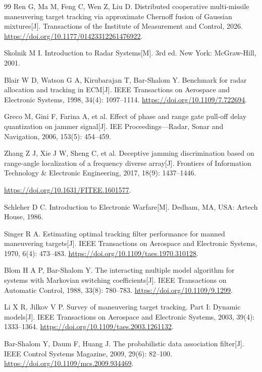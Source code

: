 \documentclass[UTF8,a4paper,zihao=-4]{ctexart}
\begin{document}
{\begin{thebibliography}{99}
 Ren G, Ma M, Feng C, Wen Z, Liu D. Distributed cooperative multi-missile maneuvering target tracking via approximate Chernoff fusion of Gaussian mixtures[J]. Transactions of the Institute of Measurement and Control, 2026.
\url{https://doi.org/10.1177/01423312261476922}.

 Skolnik M I. Introduction to Radar Systems[M]. 3rd ed. New York: McGraw-Hill, 2001.

 Blair W D, Watson G A, Kirubarajan T, Bar-Shalom Y. Benchmark for radar allocation and tracking in ECM[J]. IEEE Transactions on Aerospace and Electronic Systems, 1998, 34(4): 1097--1114. \url{https://doi.org/10.1109/7.722694}.

 Greco M, Gini F, Farina A, et al. Effect of phase and range gate pull-off delay quantization on jammer signal[J]. IEE Proceedings---Radar, Sonar and Navigation, 2006, 153(5): 454--459.

 Zhang Z J, Xie J W, Sheng C, et al. Deceptive jamming discrimination based on range-angle localization of a frequency diverse array[J]. Frontiers of Information Technology \& Electronic Engineering, 2017, 18(9): 1437--1446.

\url{https://doi.org/10.1631/FITEE.1601577}.

 Schleher D C. Introduction to Electronic Warfare[M]. Dedham, MA, USA: Artech House, 1986.

 Singer R A. Estimating optimal tracking filter performance for manned maneuvering targets[J]. IEEE Transactions on Aerospace and Electronic Systems, 1970, 6(4): 473--483.
\url{https://doi.org/10.1109/taes.1970.310128}.

 Blom H A P, Bar-Shalom Y. The interacting multiple model algorithm for systems with Markovian switching coefficients[J]. IEEE Transactions on Automatic Control, 1988, 33(8): 780--783.
\url{https://doi.org/10.1109/9.1299}.

 Li X R, Jilkov V P. Survey of maneuvering target tracking. Part I: Dynamic models[J]. IEEE Transactions on Aerospace and Electronic Systems, 2003, 39(4): 1333--1364.
\url{https://doi.org/10.1109/taes.2003.1261132}.

 Bar-Shalom Y, Daum F, Huang J. The probabilistic data association filter[J]. IEEE Control Systems Magazine, 2009, 29(6): 82--100.
\url{https://doi.org/10.1109/mcs.2009.934469}.


\end{thebibliography}}
\end{document}
